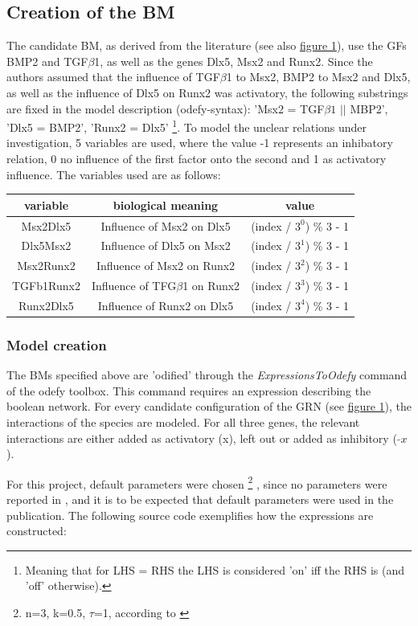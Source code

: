\documentclass[11pt]{article}
\begin{document}
\subsection{Creation of the BM} \label{ssec:creation}
The candidate BM, as derived from the literature (see also \hyperref[regulatory_network]{figure 1}), use the GFs
BMP2 and TGF$\beta$1, as well as the genes Dlx5, Msx2 and Runx2.
Since the authors assumed that the influence of TGF$\beta$1 to Msx2, BMP2 to Msx2 and Dlx5, as well as the influence of Dlx5 on Runx2 was activatory, the following substrings are fixed in the model description (odefy-syntax):
'Msx2 = TGF$\beta1$ $||$ MBP2', 'Dlx5 = BMP2', 'Runx2 = Dlx5' \footnote{Meaning that for LHS = RHS the LHS is considered 'on' iff the RHS is (and 'off' otherwise).}.
To model the unclear relations under investigation, 5 variables are used, where the value -1 represents an inhibatory relation, 0 no influence of the first factor onto the second and 1 as activatory influence. The variables used are as follows:

\begin{tabular}{c c c}
\textbf{variable} & \textbf{biological meaning} & \textbf{value} \\
\hline
Msx2Dlx5 & Influence of Msx2 on Dlx5 & (index / $3^{0}$) \% 3 - 1 \\
Dlx5Msx2 &  Influence of Dlx5 on Msx2 & (index / $3^{1}$) \% 3 - 1 \\ 
Msx2Runx2 &  Influence of Msx2 on Runx2 & (index / $3^{2}$) \% 3 - 1 \\ 
TGFb1Runx2 &  Influence of TFG$\beta$1 on Runx2 & (index / $3^{3}$) \% 3 - 1 \\ 
Runx2Dlx5 &  Influence of Runx2 on Dlx5 & (index / $3^{4}$) \% 3 - 1 \\
\end{tabular}

\subsubsection{Model creation}
The BMs specified above are 'odified' through the \textit{ExpressionsToOdefy} command of the odefy toolbox. This command requires an expression describing the boolean network. For every candidate configuration of the GRN (see \hyperref[regulatory_network]{figure 1}), the interactions of the species are modeled. For all three genes, the relevant
interactions are either added as activatory (x), left out or added as inhibitory ( $\tilde{} x$).

For this project, default parameters were chosen \footnote{n=3, k=0.5, $\tau$=1, according to \cite{Krumsiek}} , since no parameters were reported in \cite{Kirkham}, and it is to be expected that default parameters were used in the publication. The following source code exemplifies how the expressions are constructed:
\end{document}
